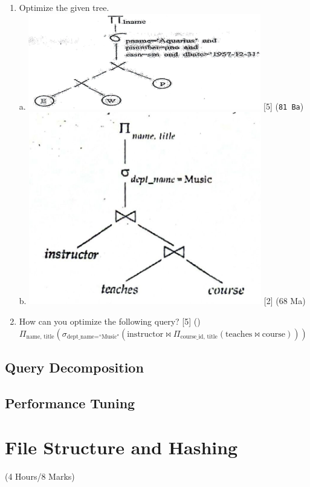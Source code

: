 \documentclass[12pt]{article}
\begin{document}
\begin{enumerate}[noitemsep, topsep=0pt]
            \item Optimize the given tree. \\
            a. \includegraphics[width=4in]{dbms_1} \hfill [5] (\texttt{81 Ba})\\
            b. \includegraphics[width=4in]{dbms_2} \hfill [2] (68 Ma)
            
            \item How can you optimize the following query? \hfill [5] ()\\
            $\Pi_{\text{name, title}}\left(\sigma_{\text{dept\_name=``Music"}}(\text{instructor} \bowtie \Pi_{\text{course\_id, title}} (\text{teaches} \bowtie \text{course}))\right)$
        \end{enumerate}
    \subsection{Query Decomposition}
    \subsection{Performance Tuning}

    \pagebreak
\section{File Structure and Hashing}
    \begin{center}(4 Hours/8 Marks)\end{center}
\end{document}
